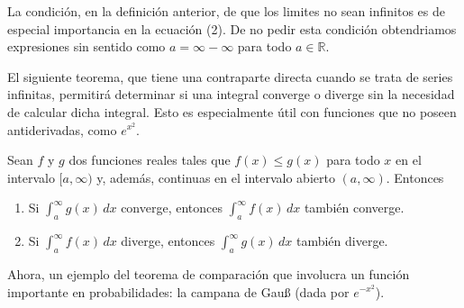 \documentclass[mid,fleqn,draft,twoside]{notasdeclase}
\newcommand{\inte}[4]{\int_{#1}^{#2} #3\, d#4}
\newcommand{\R}{\mathbb{R}}
\begin{document}
\noindent
La condición, en la definición anterior, de que los limites no sean infinitos es de especial importancia en la ecuación (2). De no pedir esta condición obtendriamos expresiones sin sentido como $a=\infty-\infty$ para todo $a\in\R$.

El siguiente teorema, que tiene una contraparte directa cuando se trata de series infinitas, permitirá determinar si una integral converge o diverge sin la necesidad de calcular dicha integral. Esto es especialmente útil con funciones que no poseen antiderivadas, como $e^{x^2}$.

\begin{teo}[de comparación]
	Sean $f$ y $g$ dos funciones reales tales que $f(x)\leq g(x)$ para todo $x$ en el intervalo $[a,\infty)$ y, además, continuas en el intervalo abierto $(a,\infty)$. Entonces
	\begin{enumerate}
		\item Si $\inte{a}{\infty}{g(x)}{x}$ converge, entonces $\inte{a}{\infty}{f(x)}{x}$ también converge.
		\item Si $\inte{a}{\infty}{f(x)}{x}$ diverge, entonces $\inte{a}{\infty}{g(x)}{x}$ también diverge.
	\end{enumerate}
\end{teo}

Ahora, un ejemplo del teorema de comparación que involucra un función importante en probabilidades: la campana de Gau{\ss} (dada por $e^{-x^2}$).
\end{document}
